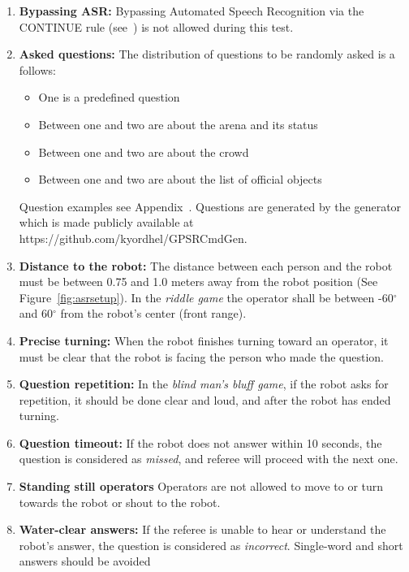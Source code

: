 \begin{enumerate}
    \item \textbf{Bypassing ASR:} Bypassing Automated Speech Recognition via the CONTINUE rule (see~) is not allowed during this test.
    \item \textbf{Asked questions:} The distribution of questions to be randomly asked is a follows:
    \begin{itemize}
        \item One is a predefined question
        \item Between one and two are about the arena and its status
        \item Between one and two are about the crowd
        \item Between one and two are about the list of official objects
    \end{itemize}
    Question examples see Appendix~. Questions are generated by the generator which is made publicly available at https://github.com/kyordhel/GPSRCmdGen.
    \item \textbf{Distance to the robot:} The distance between each person and the robot must be between 0.75 and 1.0 meters away from the robot position (See Figure~\ref{fig:asrsetup}). In the \textit{riddle game} the operator shall be between -60$^{\circ}$ and 60$^{\circ}$ from the robot's center (front range).
    \item \textbf{Precise turning:} When the robot finishes turning toward an operator, it must be clear that the robot is facing the person who made the question.
    \item \textbf{Question repetition:} In the \textit{blind man's bluff game}, if the robot asks for repetition, it should be done clear and loud, and after the robot has ended turning.
    \item \textbf{Question timeout:} If the robot does not answer within 10 seconds, the question is considered as \textit{missed}, and referee will proceed with the next one.
    \item \textbf{Standing still operators} Operators are not allowed to move to or turn towards the robot or shout to the robot.
    \item \textbf{Water-clear answers:} If the referee is unable to hear or understand the robot's answer, the question is considered as \textit{incorrect}. Single-word and short answers should be avoided
\end{enumerate}

